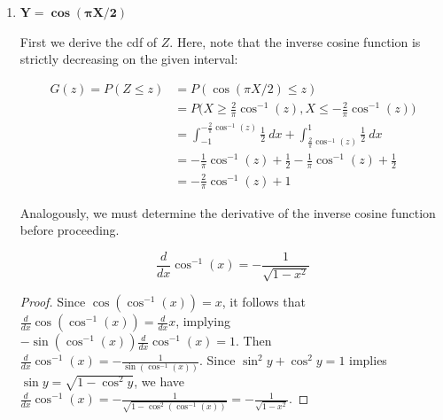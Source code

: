 \documentclass[10pt, oneside]{article}
\begin{document}
\begin{enumerate}[label=5.\arabic*]
\begin{enumerate}
	Proceeding, we derive:
	
	\[ G'(y) = g(y) = \frac{d}{dy} \Big( \frac{1}{\pi} \sin^{-1} (y) + \frac{1}{2} \Big) = \boxed{\frac{1}{\pi} \frac{1}{\sqrt{1 - y^2}} } \]
	
	For $Y = \sin(\pi X / 2)$ on $-1 < X < 1$, it follows that $-1 < Y < 1$. Then $g(y) \geq 0$ for $-1 < Y < 1$. Additionally, $\int^1_{-1} \frac{1}{\pi} \frac{1}{\sqrt{1 - y^2}} dy = \boxed{1}$, confirming $g(y)$ is a pdf.
	
	Alternatively, because $Y = \sin(\pi X / 2), -1 < X < 1$ is monotonic, we may apply Theorem 5.1. Finding $X = (2 / \pi) \sin^{-1} (y)$ as before, it follows that $\frac{dx}{dy} = |\frac{dx}{dy}| = \frac{2}{\pi \sqrt{1 - y^2}}$, and $g(y) = \frac{1}{2} \cdot \frac{2}{\pi \sqrt{1 - y^2}} = \frac{1}{\pi \sqrt{1-y^2}}$, as expected.
	
	\item  \begin{tcolorbox}[
	  colback=Cerulean!5!white,
	  colframe=Cerulean!75!black]
	\textbf{$\bm{Y = \cos (\pi X / 2)}$}
	\end{tcolorbox}
	
	First we derive the cdf of $Z$. Here, note that the inverse cosine function is strictly decreasing on the given interval:
	
	\begin{align*}
	G(z) = P(Z \leq z) &= P(\cos (\pi X / 2) \leq z) \\
	&= P \Big(X \geq \frac{2}{\pi} \cos^{-1} (z), X \leq -\frac{2}{\pi} \cos^{-1} (z) \Big) \\
	&= \int^{-\frac{2}{\pi} \cos^{-1} (z)}_{-1} \frac{1}{2} \ dx + \int^1_{\frac{2}{\pi} \cos^{-1} (z)} \frac{1}{2} \ dx \\
	&= -\frac{1}{\pi} \cos^{-1} (z) + \frac{1}{2} - \frac{1}{\pi} \cos^{-1} (z) + \frac{1}{2} \\
	&= -\frac{2}{\pi} \cos^{-1} (z) + 1
	\end{align*}
	
	Analogously, we must determine the derivative of the inverse cosine function before proceeding.
	
	\begin{thm}
	\[ \frac{d}{dx} \cos^{-1}(x) = - \frac{1}{\sqrt{1 - x^2}} \]
	\end{thm}
	
	\begin{proof}
	Since $\cos (\cos^{-1} (x)) = x$, it follows that $\frac{d}{dx} \cos (\cos^{-1} (x)) = \frac{d}{dx} x$, implying $-\sin( \cos^{-1} (x)) \frac{d}{dx} \cos^{-1} (x) = 1$. Then $\frac{d}{dx} \cos^{-1}(x) = -\frac{1}{\sin(\cos^{-1} (x))}$. Since $\sin^2 y + \cos^2 y = 1$ implies $\sin y = \sqrt{1 - \cos^2 y}$, we have $\frac{d}{dx} \cos^{-1}(x) = -\frac{1}{\sqrt{1 - \cos^2 (\cos^{-1} (x))}} = -\frac{1}{\sqrt{1-x^2}}$.
	\end{proof}
	

\end{enumerate}
\end{enumerate}
\end{document}
